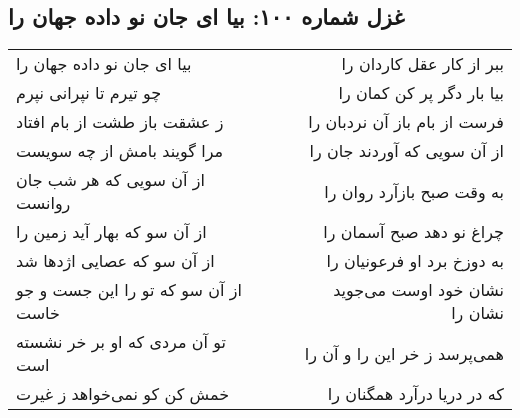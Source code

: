\begin{center}
\section*{غزل شماره ۱۰۰: بیا ای جان نو داده جهان را}
\label{sec:0100}
\begin{longtable}{l p{0.5cm} r}
بیا ای جان نو داده جهان را
&&
ببر از کار عقل کاردان را
\\
چو تیرم تا نپرانی نپرم
&&
بیا بار دگر پر کن کمان را
\\
ز عشقت باز طشت از بام افتاد
&&
فرست از بام باز آن نردبان را
\\
مرا گویند بامش از چه سویست
&&
از آن سویی که آوردند جان را
\\
از آن سویی که هر شب جان روانست
&&
به وقت صبح بازآرد روان را
\\
از آن سو که بهار آید زمین را
&&
چراغ نو دهد صبح آسمان را
\\
از آن سو که عصایی اژدها شد
&&
به دوزخ برد او فرعونیان را
\\
از آن سو که تو را این جست و جو خاست
&&
نشان خود اوست می‌جوید نشان را
\\
تو آن مردی که او بر خر نشسته است
&&
همی‌پرسد ز خر این را و آن را
\\
خمش کن کو نمی‌خواهد ز غیرت
&&
که در دریا درآرد همگنان را
\\
\end{longtable}
\end{center}
